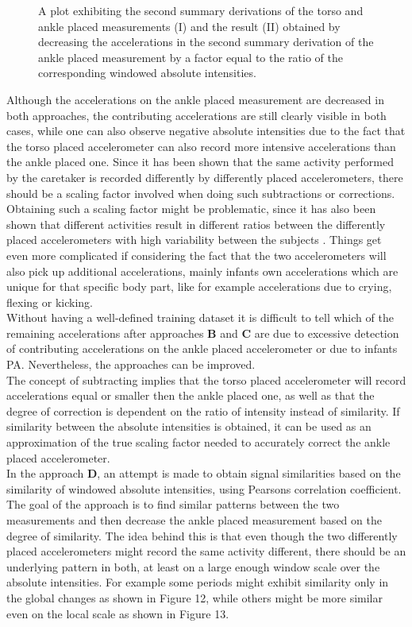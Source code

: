 \documentclass{article}
\begin{document}
{\begin{figure}[h!]
\caption{A plot exhibiting the second summary derivations of the torso and ankle placed measurements (I) and the result (II) obtained by decreasing the accelerations in the second summary derivation of the ankle placed measurement by a factor equal to the ratio of the corresponding windowed absolute intensities.}
\end{figure}
\newpage
Although the accelerations on the ankle placed measurement are decreased in both approaches, the contributing accelerations are still clearly visible in both cases, while one can also observe negative absolute intensities due to the fact that the torso placed accelerometer can also record more intensive accelerations than the ankle placed one. Since it has been shown that the same activity performed by the caretaker is recorded differently by differently placed accelerometers, there should be a scaling factor involved when doing such subtractions or corrections. Obtaining such a scaling factor might be problematic, since it has also been shown that different activities result in different ratios between the differently placed accelerometers with high variability between the subjects \cite{ref5}. Things get even more complicated if considering the fact that the two accelerometers will also pick up additional accelerations, mainly infants own accelerations which are unique for that specific body part, like for example accelerations due to crying, flexing or kicking.\\Without having a well-defined training dataset it is difficult to tell which of the remaining accelerations after approaches \textbf{B} and \textbf{C} are due to excessive detection of contributing accelerations on the ankle placed accelerometer or due to infants PA. Nevertheless, the approaches can be improved.\\The concept of subtracting implies that the torso placed accelerometer will record accelerations equal or smaller then the ankle placed one, as well as that the degree of correction is dependent on the ratio of intensity instead of similarity. If similarity between the absolute intensities is obtained, it can be used as an approximation of the true scaling factor needed to accurately correct the ankle placed accelerometer. \\
In the approach \textbf{D}, an attempt is made to obtain signal similarities based on the similarity of windowed absolute intensities, using Pearsons correlation coefficient. The goal of the approach is to find similar patterns between the two measurements and then decrease the ankle placed measurement based on the degree of similarity. The idea behind this is that even though the two differently placed accelerometers might record the same activity different, there should be an underlying pattern in both, at least on a large enough window scale over the absolute intensities. For example some periods might exhibit similarity only in the global changes as shown in Figure 12, while others might be more similar even on the local scale as shown in Figure 13.
}
\end{document}
